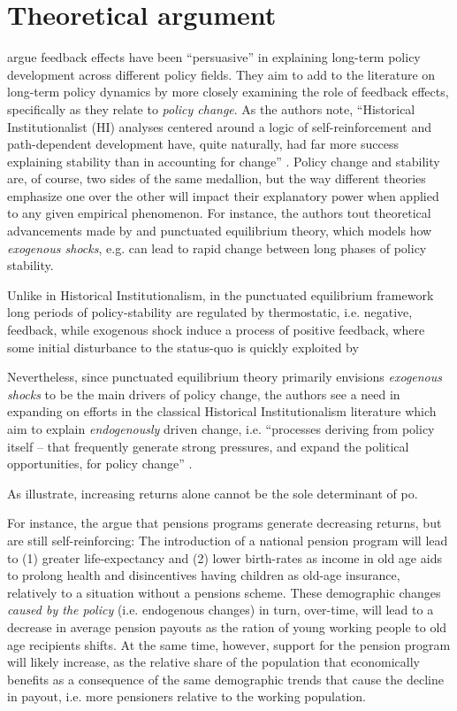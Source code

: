 \documentclass[11pt]{article}
\begin{document}
\section*{Theoretical argument}
\textcite[][]{Jacobs2014} argue feedback effects have been \enquote{persuasive}  in explaining long-term policy development across different policy fields. They aim to add to the literature on long-term policy dynamics by more closely examining the role of feedback effects, specifically as they relate to \textit{policy change}. As the authors note, \enquote{Historical Institutionalist (HI) analyses centered around a logic of self-reinforcement and path-dependent development have, quite naturally, had far more success explaining stability than in accounting for change} \parencite[][p. 443]{Jacobs2014}. Policy change and stability are, of course, two sides of the same medallion, but the way different theories emphasize one over the other will impact their explanatory power when applied to any given empirical phenomenon. For instance, the authors tout theoretical advancements made by \textcite[][]{Baumgartner2002} and punctuated equilibrium theory, which models how \textit{exogenous shocks}, e.g. can lead to rapid change between long phases of policy stability. 

Unlike in Historical Institutionalism, in the punctuated equilibrium framework long periods of policy-stability are regulated by thermostatic, i.e. negative, feedback, while exogenous shock induce a process of positive feedback, where some initial disturbance to the status-quo is quickly exploited by 

Nevertheless, since punctuated equilibrium theory primarily envisions \textit{exogenous shocks} to be the main drivers of policy change, the authors see a need in expanding on efforts in the classical Historical Institutionalism literature which aim to explain \textit{endogenously} driven change, i.e. \enquote{processes deriving from policy itself -- that frequently generate strong pressures, and expand the political opportunities, for policy change} \parencite[p. 442]{Jacobs2014}. 

As \textcite{Greif2004} illustrate, increasing returns alone cannot be the sole determinant of po. 


For instance, the \textcite{Greif2004} argue that pensions programs generate decreasing returns, but are still self-reinforcing: The introduction of a national pension program will lead to (1) greater life-expectancy and (2) lower birth-rates as income in old age aids to prolong health and disincentives having children as old-age insurance, relatively to a situation without a pensions scheme. These demographic changes \textit{caused by the policy} (i.e. endogenous changes) in turn, over-time, will lead to a decrease in average pension payouts as the ration of young working people to old age recipients shifts. At the same time, however, support for the pension program will likely increase, as the relative share of the population that economically benefits as a consequence of the same demographic trends that cause the decline in payout, i.e. more pensioners relative to the working population. 
\end{document}
